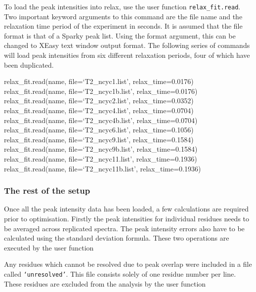 To load the peak intensities into relax, use the user function \texttt{relax\_fit.read}.  Two important keyword arguments to this command are the file name and the relaxation time period of the experiment in seconds.  It is assumed that the file format is that of a Sparky peak list.  Using the format argument, this can be changed to XEasy text window output format.  The following series of commands will load peak intensities from six different relaxation periods, four of which have been duplicated.

\begin{exampleenv}
relax\_fit.read(name, file=`T2\_ncyc1.list', relax\_time=0.0176) \\
relax\_fit.read(name, file=`T2\_ncyc1b.list', relax\_time=0.0176) \\
relax\_fit.read(name, file=`T2\_ncyc2.list', relax\_time=0.0352) \\
relax\_fit.read(name, file=`T2\_ncyc4.list', relax\_time=0.0704) \\
relax\_fit.read(name, file=`T2\_ncyc4b.list', relax\_time=0.0704) \\
relax\_fit.read(name, file=`T2\_ncyc6.list', relax\_time=0.1056) \\
relax\_fit.read(name, file=`T2\_ncyc9.list', relax\_time=0.1584) \\
relax\_fit.read(name, file=`T2\_ncyc9b.list', relax\_time=0.1584) \\
relax\_fit.read(name, file=`T2\_ncyc11.list', relax\_time=0.1936) \\
relax\_fit.read(name, file=`T2\_ncyc11b.list', relax\_time=0.1936)
\end{exampleenv}


\subsubsection{The rest of the setup}

Once all the peak intensity data has been loaded, a few calculations are required prior to optimisation.  Firstly the peak intensities for individual residues needs to be averaged across replicated spectra.  The peak intensity errors also have to be calculated using the standard deviation formula.  These two operations are executed by the user function


Any residues which cannot be resolved due to peak overlap were included in a file called \texttt{`unresolved'}.  This file consists solely of one residue number per line.  These residues are excluded from the analysis by the user function

